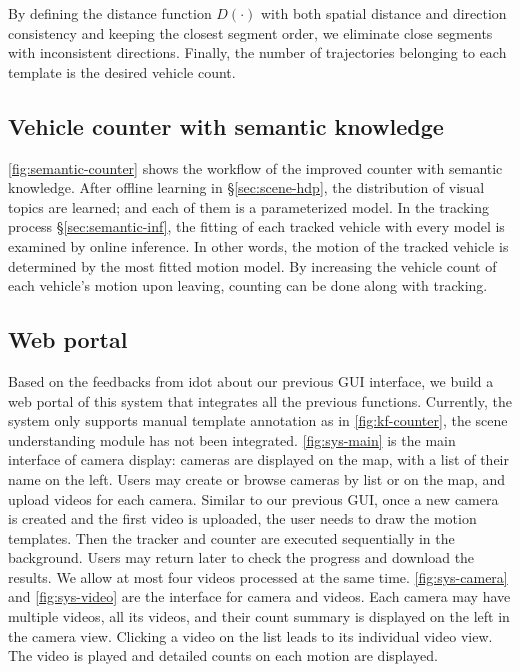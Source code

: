 By defining the distance function $D(\cdot)$ with both spatial distance and direction consistency and keeping the closest segment order, we eliminate close segments with inconsistent directions. 
Finally, the number of trajectories belonging to each template is the desired vehicle count.

\subsection{Vehicle counter with semantic knowledge}
\ref{fig:semantic-counter} shows the workflow of the improved counter with semantic knowledge. 
After offline learning in \S\ref{sec:scene-hdp}, the distribution of visual topics are learned; and each of them is a parameterized model.
In the tracking process \S\ref{sec:semantic-inf}, the fitting of each tracked vehicle with every model is examined by online inference.
In other words, the motion of the tracked vehicle is determined by the most fitted motion model. 
By increasing the vehicle count of each vehicle's motion upon leaving, counting can be done along with tracking. 



\subsection{Web portal}
Based on the feedbacks from \gls{idot} about our previous GUI interface, we build a web portal of this system that integrates all the previous functions.
Currently, the system only supports manual template annotation as in \ref{fig:kf-counter}, the scene understanding module has not been integrated.
\ref{fig:sys-main} is the main interface of camera display: cameras are displayed on the map, with a list of their name on the left. 
Users may create or browse cameras by list or on the map, and upload videos for each camera. 
Similar to our previous GUI, once a new camera is created and the first video is uploaded, the user needs to draw the motion templates.
Then the tracker and counter are executed sequentially in the background. 
Users may return later to check the progress and download the results. We allow at most four videos processed at the same time. 
\ref{fig:sys-camera} and \ref{fig:sys-video} are the interface for camera and videos. 
Each camera may have multiple videos, all its videos, and their count summary is displayed on the left in the camera view. 
Clicking a video on the list leads to its individual video view. The video is played and detailed counts on each motion are displayed.

